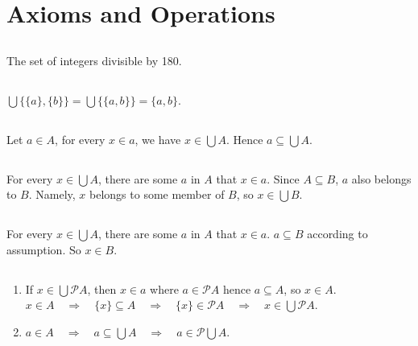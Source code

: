 \chapter{Axioms and Operations}

\section{}
The set of integers divisible by 180.


\section{}
$ \bigcup\{\{a\}, \{b\}\} = \bigcup\{\{a,b\}\} = \{a,b\} $.


\section{}
Let $ a \in A $, for every $ x \in a $, we have $ x \in \bigcup A $.
Hence $ a \subseteq \bigcup A $.


\section{}
For every $ x \in \bigcup A $, there are some $a$ in $A$ that $ x \in a $.
Since $ A \subseteq B $, $a$ also belongs to $B$. Namely, $x$ belongs to
some member of $B$, so $ x \in \bigcup B $.


\section{}
For every $ x \in \bigcup A $, there are some $a$ in $A$ that $ x \in a $.
$ a \subseteq B $ according to assumption. So $ x \in B $.


\section{}
\begin{enumerate}
  \item
  If $ x \in \bigcup\mathscr{P}A $, then $ x \in a $ where $ a \in \mathscr{P}A $
  hence $ a \subseteq A $, so $ x \in A $. \\
  $ x \in A \quad \Rightarrow \quad  \{x\} \subseteq A  \quad \Rightarrow \quad
   \{x\} \in \mathscr{P}A  \quad \Rightarrow \quad   x \in \bigcup\mathscr{P}A $.

  \item
  $ a \in A  \quad \Rightarrow \quad  a \subseteq \bigcup A
    \quad \Rightarrow \quad  a \in \mathscr{P}\bigcup A $.
\end{enumerate}


